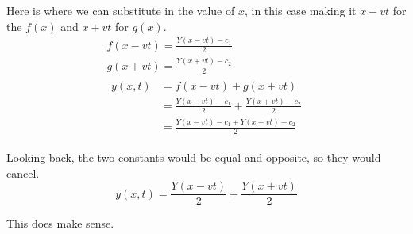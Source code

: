 \documentclass[12pt]{article}
\begin{document}
            Here is where we can substitute in the value of $x$, in this case making it $x - vt$ for the $f(x)$ and $x + vt$ for $g(x)$.
            \begin{gather}
                f(x - vt)   =   \frac{Y(x - vt) - c_1}{2}\\
                g(x + vt)   =   \frac{Y(x + vt) - c_2}{2}\\
                \begin{align}
                    y(x,t)  &=  f(x - vt) + g(x + vt)\\
                        &=  \frac{Y(x - vt) - c_1}{2} + \frac{Y(x + vt) - c_2}{2}\\
                        &=  \frac{Y(x - vt) - c_1 + Y(x + vt) - c_2}{2}
                \end{align}
            \end{gather}

            Looking back, the two constants would be equal and opposite, so they would cancel.
            \begin{equation}
                y(x,t)  =   \frac{Y(x - vt)}{2} + \frac{Y(x + vt)}{2}
            \end{equation}

            This does make sense.
\end{document}
